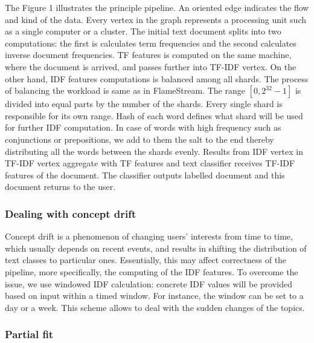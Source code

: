 The Figure 1 illustrates the principle pipeline. An oriented edge indicates the flow and kind of the data. Every vertex in the graph represents a processing unit such as a single computer or a cluster. The initial text document splits into two computations: the first is calculates term frequencies and the second calculates inverse document frequencies. TF features is computed on the same machine, where the document is arrived, and passes further into TF-IDF vertex. On the other hand, IDF features computations is balanced among all shards. The process of balancing the workload is same as in FlameStream. The range $[0, 2^{32} - 1]$ is divided into equal parts by the number of the shards. Every single shard is responsible for its own range. Hash of each word defines what shard will be used for further IDF computation. In case of words with high frequency such as conjunctions or prepositions, we add to them the salt to the end thereby distributing all the words between the shards evenly. Results from IDF vertex in TF-IDF vertex aggregate with TF features and text classifier receives TF-IDF features of the document. The classifier outputs labelled document and this document returns to the user.

\subsubsection{Dealing with concept drift}

Concept drift is a phenomenon of changing users' interests from time to time, which usually depends on recent events, and results in shifting the distribution of text classes to particular ones. Essentially, this may affect correctness of the pipeline, more specifically, the computing of the IDF features. To overcome the issue, we use windowed IDF calculation: concrete IDF values will be provided based on input within a timed window. For instance, the window can be set to a day or a week. This scheme allows to deal with the sudden changes of the topics.

\subsubsection{Partial fit}

